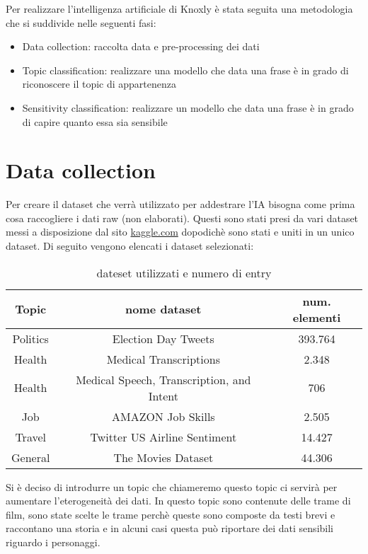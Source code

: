 Per realizzare l'intelligenza artificiale di Knoxly è stata seguita una metodologia che si suddivide nelle seguenti fasi:
\begin{itemize}
    \item Data collection: raccolta data e pre-processing dei dati
    \item Topic classification: realizzare una modello che data una frase è in grado di riconoscere il topic di appartenenza
    \item Sensitivity classification: realizzare un modello che data una frase è in grado di capire quanto essa sia sensibile
\end{itemize}
\section{Data collection}
Per creare il dataset che verrà utilizzato per addestrare l'IA bisogna come prima cosa raccogliere i dati raw (non elaborati). Questi sono stati presi da vari dataset messi a disposizione dal sito \href{https://www.kaggle.com/}{kaggle.com} dopodichè sono stati  e uniti in un unico dataset. Di seguito vengono elencati i dataset selezionati:\newline
\begin{table}[h]
\centering
\begin{tabular}{|c|c|c|}
\hline
\textbf{Topic} & \textbf{nome dataset} & \textbf{num. elementi} \\ \hline
Politics & Election Day Tweets & 393.764 \\ \hline
Health & Medical Transcriptions & 2.348 \\ \hline
Health & Medical Speech, Transcription, and Intent & 706 \\ \hline
Job & AMAZON Job Skills & 2.505 \\ \hline
Travel & Twitter US Airline Sentiment & 14.427 \\ \hline
General & The Movies Dataset & 44.306 \\ \hline
\end{tabular}
\caption{dateset utilizzati e numero di entry}
\end{table}
\FloatBarrier
Si è deciso di introdurre un topic che chiameremo  questo topic ci servirà per aumentare l'eterogeneità dei dati. In questo topic sono contenute delle trame di film, sono state scelte le trame perchè queste sono composte da testi brevi e raccontano una storia e in alcuni casi questa può riportare dei dati sensibili riguardo i personaggi.\newline
